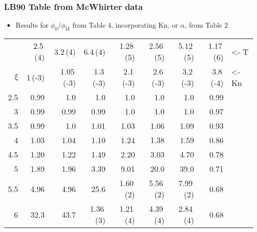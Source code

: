 \documentclass[11pt]{article}
\begin{document}
\subsubsection{LB90 Table from McWhirter data}
\label{sec:orgheadline14}
\begin{itemize}
\item Results for \(\phi_{\text{0}}\)/\(\phi_{\text{M}}\) from Table 4, incorporating Kn, or \(\alpha\), from Table 2
\end{itemize}
\begin{center}
\label{tab:orgtable1}

\begin{tabular}{rrrrrrrrl}
 & 2.5\,(4) & 3.2\,(4) & 6.4\,(4) & 1.28\,(5) & 2.56\,(5) & 5.12\,(5) & 1.17\,(6) & <- T\\
\(\xi\) & 1\,(-3) & 1.05\,(-3) & 1.3\,(-3) & 2.1\,(-3) & 2.6\,(-3) & 3.2\,(-3) & 3.8\,(-4) & <- Kn\\
\hline
2.5 & 0.99 & 1.0 & 1.0 & 1.0 & 1.0 & 1.0 & 0.99 & \\
3 & 0.99 & 0.99 & 0.99 & 1.0 & 1.0 & 1.0 & 0.97 & \\
3.5 & 0.99 & 1.0 & 1.01 & 1.03 & 1.06 & 1.09 & 0.93 & \\
4 & 1.03 & 1.04 & 1.10 & 1.24 & 1.38 & 1.59 & 0.86 & \\
4.5 & 1.20 & 1.22 & 1.49 & 2.20 & 3.03 & 4.70 & 0.78 & \\
5 & 1.89 & 1.96 & 3.39 & 9.01 & 20.0 & 39.0 & 0.71 & \\
5.5 & 4.96 & 4.96 & 25.6 & 1.60\,(2) & 5.56\,(2) & 7.99\,(2) & 0.68 & \\
6 & 32.3 & 43.7 & 1.36\,(3) & 1.21\,(4) & 4.39\,(4) & 2.84\,(4) & 0.68 & \\
\end{tabular}
\end{center}
\end{document}
